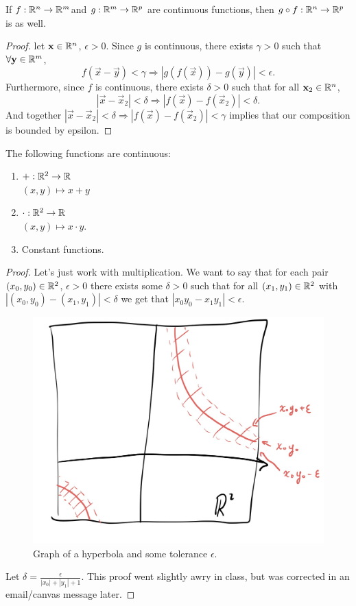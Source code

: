 \documentclass[12pt, twosided]{article}
\begin{document}
\begin{prop}
  If \(f: \mathbb{R}^n \to \mathbb{R}^m\)and \(g: \mathbb{R}^m \to \mathbb{R}^p\) are continuous functions, then \(g \circ f: \mathbb{R}^n \to \mathbb{R}^p\) is as well.
\end{prop}
\begin{proof}
  let \(\mathbf{x} \in \mathbb{R}^n\), \(\epsilon > 0\). Since \(g\) is continuous, there exists \(\gamma > 0\) such that \(\forall \mathbf{y} \in \mathbb{R}^m\), \[f(\vec{x} - \vec{y}) < \gamma \Rightarrow |g(f(\vec{x})) - g(\vec{y})| < \epsilon.\] Furthermore, since \(f\) is continuous, there exists \(\delta > 0\) such that for all \(\mathbf{x}_2 \in \mathbb{R}^n\), \[|\vec{x} - \vec{x}_2| <\delta \Rightarrow |f(\vec{x}) - f(\vec{x}_2)| < \delta.\] And together \(|\vec{x} - \vec{x}_2| < \delta \Rightarrow |f(\vec{x}) - f(\vec{x}_2)| < \gamma\) implies that our composition is bounded by epsilon.
\end{proof}

\begin{prop}
  The following functions are continuous:
  \begin{enumerate}
  \item \(+: \mathbb{R}^2 \to \mathbb{R}\) \\
    \((x, y) \mapsto x + y\)
  \item \(\cdot: \mathbb{R}^2 \to \mathbb{R}\) \\
    \((x, y) \mapsto x \cdot y\).
  \item Constant functions.
  \end{enumerate}
\end{prop}
\begin{proof}
  Let's just work with multiplication. We want to say that for each pair \((x_0, y_0)  \in \mathbb{R}^2\), \(\epsilon > 0\) there exists some \(\delta > 0\) such that for all \((x_1, y_1) \in \mathbb{R}^2\) with \(|(x_0, y_0) - (x_1, y_1)| < \delta\) we get that \(|x_0y_0 - x_1y_1| < \epsilon\).
  \begin{figure}[h]
    \centering
    \includegraphics[width=.5\textwidth]{hw_3}
    \caption{Graph of a hyperbola and some tolerance \(\epsilon\).}
    \label{fig:Hyperbola}
  \end{figure}
  Let \(\delta = \frac{\epsilon}{|x_0| + |y_1| + 1}\). This proof went slightly awry in class, but was corrected in an email/canvas message later.
\end{proof}
\end{document}
